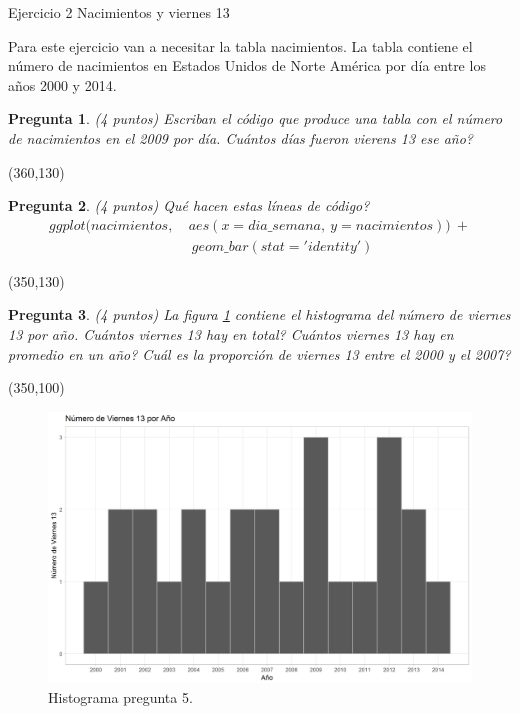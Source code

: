 \documentclass{article}
\newtheorem{pregunta}{Pregunta}
\begin{document}
\begin{topbot}
  \vspace{0.7em}
  Ejercicio 2 \quad Nacimientos y viernes 13
  \vspace{0.7em}
\end{topbot}

Para este ejercicio van a necesitar la tabla nacimientos. La tabla contiene el número de nacimientos en Estados Unidos de Norte América por día entre los años 2000 y 2014.
\begin{pregunta} (4 puntos)
Escriban el código que produce una tabla con el número de nacimientos en el 2009 por día. Cuántos días fueron vierens 13 ese año?
\end{pregunta}
\framebox(360,130){} \\
\par
\begin{pregunta} (4 puntos)
Qué hacen estas líneas de código?
\begin{align*}
  ggplot(nacimientos,\ & aes(x=dia\_semana, \ y=nacimientos)) \ + \\
    & \ geom\_bar(stat='identity')
\end{align*}

\end{pregunta}
\framebox(350,130){} \\

\begin{pregunta} (4 puntos)
La figura \ref{fig:hist} contiene el histograma del número de viernes 13 por año. Cuántos viernes 13 hay en total? Cuántos viernes 13 hay en promedio en un año? Cuál es la proporción de viernes 13 entre el 2000 y el 2007?
\end{pregunta}
\framebox(350,100){}
\begin{figure}[ht]
  \includegraphics[scale = 0.45] {Viernes13.png}
  \caption{Histograma pregunta 5. }
  \label{fig:hist}
\end{figure}
\end{document}
